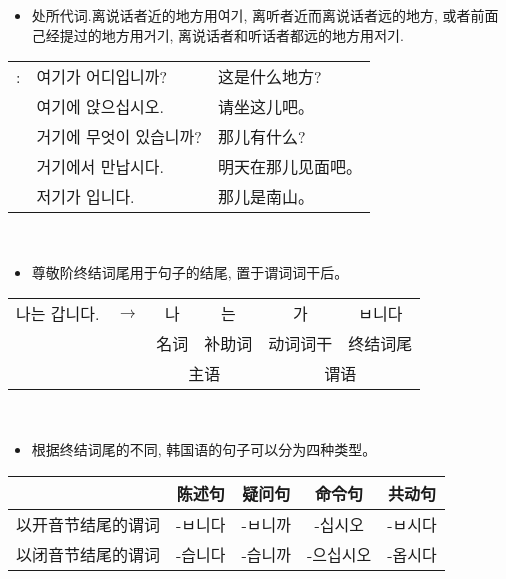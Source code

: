 \begin{grammar}
\begin{grammarsect}[\kr -에]
    \end{grammarsect}
    \begin{grammarsect}[\kr 여기, 거기, 저기]
        \begin{itemize}
            \item 处所代词.离说话者近的地方用{\kr 여기}, 离听者近而离说话者远的地方, 或者前面己经提过的地方用{\kr 거기}, 离说话者和听话者都远的地方用{\kr 저기}.
        \end{itemize}
        \begin{tabular}{lll}
            \kr \ruby{例}{예}:&\kr  여기가 어디입니까?&这是什么地方? \\
            &\kr 여기에 앉으십시오.&请坐这儿吧。\\
            &\kr 거기에 무엇이 있습니까?&那儿有什么?\\
            &\kr \ruby{來日}{내일} 거기에서 만납시다.&明天在那儿见面吧。\\
            &\kr 저기가 \ruby{南山}{남산}입니다.&那儿是南山。
        \end{tabular}\\
    \end{grammarsect}
    \begin{grammarsect}[尊敬阶终结词尾]\label{gram:ref}
        \begin{itemize}
            \item 尊敬阶终结词尾用于句子的结尾, 置于谓词词干后。
        \end{itemize}
        \begin{tabular}{llcccc}
            \kr 나는 갑니다.&$\to $&\kr 나&\kr 는&\kr 가&\kr ㅂ니다\\
            &&名词&补助词&动词词干&终结词尾\\\cmidrule(r){3-4} \cmidrule(l){5-6}
            &&\multicolumn{2}{c}{主语}&\multicolumn{2}{c}{谓语}
        \end{tabular}\\
        \begin{itemize}
            \item 根据终结词尾的不同, 韩国语的句子可以分为四种类型。
        \end{itemize}
        \begin{tabular}{|c|c|c|c|c|}\hline
            \diagbox{谓词类型}{句子类型}&陈述句&疑问句&命令句&共动句\\\hline
            以开音节结尾的谓词 &\kr -ㅂ니다 &\kr -ㅂ니까 &\kr -십시오 &\kr -ㅂ시다\\\hline
            以闭音节结尾的谓词 &\kr -습니다 &\kr -습니까 &\kr -으십시오 &\kr -옵시다\\\hline

\end{tabular}
\end{grammarsect}
\end{grammar}
